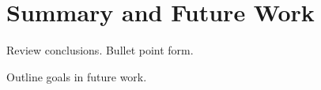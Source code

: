 \section{Summary and Future Work}\label{sec:summary}

Review conclusions.  Bullet point form.

Outline goals in future work.